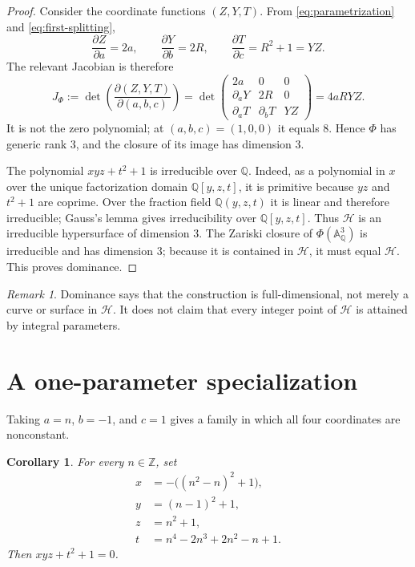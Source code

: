 \documentclass[11pt]{article}
\newtheorem{corollary}[theorem]{Corollary}
\theoremstyle{remark}
\newtheorem{remark}[theorem]{Remark}
\newcommand{\A}{\mathbb A}
\newcommand{\Q}{\mathbb Q}
\newcommand{\Z}{\mathbb Z}
\begin{document}
\begin{proof}
Consider the coordinate functions $(Z,Y,T)$.  From
\eqref{eq:parametrization} and \eqref{eq:first-splitting},
\[
\frac{\partial Z}{\partial a}=2a,
\qquad
\frac{\partial Y}{\partial b}=2R,
\qquad
\frac{\partial T}{\partial c}=R^2+1=YZ.
\]
The relevant Jacobian is therefore
\begin{equation}\label{eq:jacobian}
J_{\Phi}:=
\det\left(\frac{\partial(Z,Y,T)}{\partial(a,b,c)}\right)
=
\det
\begin{pmatrix}
2a&0&0\\
\partial_aY&2R&0\\
\partial_aT&\partial_bT&YZ
\end{pmatrix}
=4aRYZ.
\end{equation}
It is not the zero polynomial; at $(a,b,c)=(1,0,0)$ it equals $8$.
Hence $\Phi$ has generic rank $3$, and the closure of its image has
dimension $3$.

The polynomial $xyz+t^2+1$ is irreducible over $\Q$.  Indeed, as a
polynomial in $x$ over the unique factorization domain $\Q[y,z,t]$, it
is primitive because $yz$ and $t^2+1$ are coprime.  Over the fraction
field $\Q(y,z,t)$ it is linear and therefore irreducible; Gauss's
lemma gives irreducibility over $\Q[y,z,t]$.  Thus $\mathcal H$ is an
irreducible hypersurface of dimension $3$.  The Zariski closure of
$\Phi(\A^3_{\Q})$ is irreducible and has dimension $3$; because it is
contained in $\mathcal H$, it must equal $\mathcal H$.  This proves
dominance.
\end{proof}

\begin{remark}\label{rem:scope}
Dominance says that the construction is full-dimensional, not merely
a curve or surface in $\mathcal H$.  It does not claim that every
integer point of $\mathcal H$ is attained by integral parameters.
\end{remark}

\section{A one-parameter specialization}

Taking $a=n$, $b=-1$, and $c=1$ gives a family in which all four
coordinates are nonconstant.

\begin{corollary}\label{cor:one-parameter}
For every $n\in\Z$, set
\begin{equation}\label{eq:one-param}
\boxed{
\begin{aligned}
x&=-\bigl((n^2-n)^2+1\bigr),\\
y&=(n-1)^2+1,\\
z&=n^2+1,\\
t&=n^4-2n^3+2n^2-n+1.
\end{aligned}}
\end{equation}
Then $xyz+t^2+1=0$.
\end{corollary}
\end{document}
